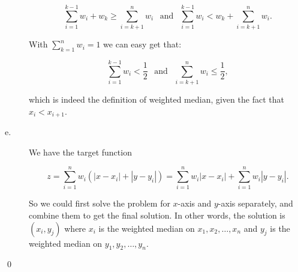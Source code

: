 \begin{description}
$$\sum_{i = 1}^{k - 1}w_i + w_k \geq \sum_{i = k  + 1}^{n}w_i \hspace{9pt}\text{and}\hspace{9pt} \sum_{i = 1}^{k - 1}w_i < w_k + \sum_{i = k  + 1}^{n}w_i.$$

With $\sum_{k = 1}^n w_i = 1$ we can easy get that:

$$\sum_{i = 1}^{k - 1}w_i < \frac{1}{2} \hspace{9pt}\text{and}\hspace{9pt} \sum_{i = k + 1}^n w_i \leq \frac{1}{2},$$

which is indeed the definition of weighted median, given the fact that $x_i < x_{i + 1}$.


\item[e. \hspace{9pt}] We have the target function

$$ z = \sum_{i = 1}^n{w_i\left(|x - x_i| + |y - y_i|\right)} = \sum_{i = 1}^n{w_i|x - x_i|}  + \sum_{i = 1}^n{w_i|y - y_i|}.$$

So we could first solve the problem for $x$-axis and $y$-axis separately, and combine them to get the final solution. In other words, the solution is
$(x_i, y_j)$ where $x_i$ is the weighted median on $x_1, x_2, \ldots, x_n$ and $y_j$ is the weighted median on $y_1, y_2, \ldots, y_n$.
\end{description}
\qed


